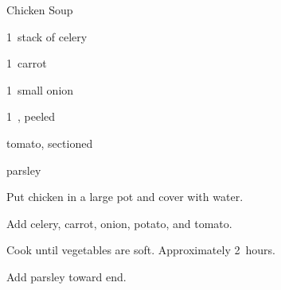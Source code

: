 \begin{recipe}{Chicken Soup}{}{}

\begin{ingredients}
\item {}
\item 1~stack of celery
\item 1~carrot
\item 1~small onion
\item 1~, peeled
\item tomato, sectioned
\item parsley
\end{ingredients}

\begin{directions}
\item Put chicken in a large pot and cover with water.
\item Add celery, carrot, onion, potato, and tomato.
\item Cook until vegetables are soft. Approximately 2~hours.
\item Add parsley toward end.
\end{directions}

\end{recipe}
